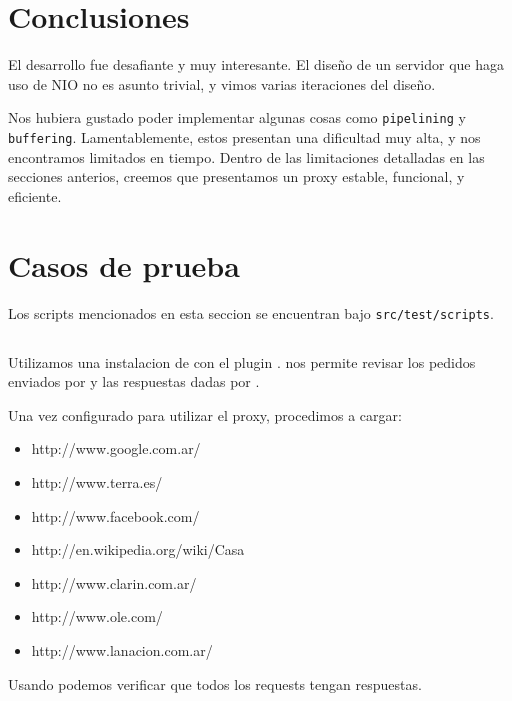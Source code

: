 \documentclass[11pt,a4paper,titlepage]{article}
\begin{document}

\section{Conclusiones}
    El desarrollo fue desafiante y muy interesante.
    El diseño de un servidor que haga uso de NIO no es asunto trivial, y vimos varias iteraciones del diseño.

    Nos hubiera gustado poder implementar algunas cosas como \texttt{pipelining} y \texttt{buffering}.
    Lamentablemente, estos presentan una dificultad muy alta, y nos encontramos limitados en tiempo.
    Dentro de las limitaciones detalladas en las secciones anterios, creemos que presentamos un proxy estable, funcional, y eficiente.


\section{Casos de prueba}

    Los scripts mencionados en esta seccion se encuentran bajo \texttt{src/test/scripts}.

    \subsection{}
    Utilizamos una instalacion de  con el plugin .
     nos permite revisar los pedidos enviados por  y las respuestas dadas por \duta.

    Una vez configurado  para utilizar el proxy, procedimos a cargar:
    \begin{itemize}
        \item http://www.google.com.ar/
        \item http://www.terra.es/
        \item http://www.facebook.com/
        \item http://en.wikipedia.org/wiki/Casa
        \item http://www.clarin.com.ar/
        \item http://www.ole.com/
        \item http://www.lanacion.com.ar/
    \end{itemize}

    Usando  podemos verificar que todos los requests tengan respuestas.
\end{document}
